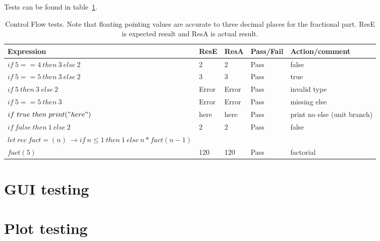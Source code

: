 Tests can be found in table~\ref{tab:control}.

\begin{table}[h]
    \caption{Control Flow tests. Note that floating pointing values are accurate to three decimal places for the fractional part. ResE is expected result and ResA is actual result. \\}
    \begin{tabular}{|p{1.8in}|p{0.5in}|p{0.4in}|p{0.6in}|p{1.4in}|} \hline
    Expression & ResE & ResA& Pass/Fail & Action/comment \\ \hline \hline
    $if\ 5 == 4\ then\ 3\ else\ 2$ & 2 & 2 & Pass & false \\ \hline
    $if\ 5 == 5\ then\ 3\ else\ 2$ & 3 & 3 & Pass & true \\ \hline
    $if\ 5\ then\ 3\ else\ 2$ & Error & Error & Pass & invalid type \\ \hline
    $if\ 5 == 5\ then\ 3$ & Error & Error & Pass & missing else \\ \hline
    $if\ true\ then\ print("here")$ & here & here & Pass & print no else (unit branch) \\ \hline
    $if\ false\ then\ 1\ else\ 2$ & 2 & 2 & Pass & false \\ \hline
    $let\ rec\ fact=(n)\ \rightarrow if\ n \leq 1\ then\ 1\ else\ n * fact(n-1)$ & & & & \\
    $fact(5)$ & 120 & 120 & Pass & factorial \\ \hline
    \end{tabular}
    \label{tab:control}
\end{table}

\section{GUI testing}\label{sec:gui-testing}

\section{Plot testing}\label{sec:plot-testing}